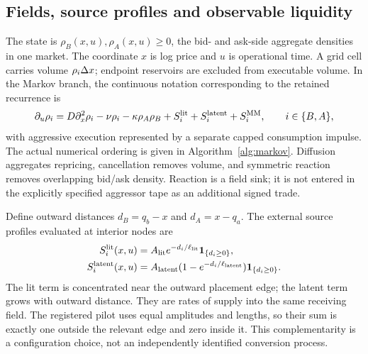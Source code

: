 \documentclass[11pt,a4paper]{article}
\begin{document}
\subsection{Fields, source profiles and observable liquidity}
The state is $\rho_B(x,u),\rho_A(x,u)\geq0$, the bid- and ask-side aggregate densities in one market. The coordinate $x$ is log price and $u$ is operational time. A grid cell carries volume $\rho_i\Delta x$; endpoint reservoirs are excluded from executable volume. In the Markov branch, the continuous notation corresponding to the retained recurrence is
\begin{equation}\label{eq:fields}
\partial_u\rho_i=D\partial_x^2\rho_i-\nu\rho_i-\kappa\rho_A\rho_B
+S_i^{\rm lit}+S_i^{\rm latent}+S_i^{\rm MM},\qquad i\in\{B,A\},
\end{equation}
with aggressive execution represented by a separate capped consumption impulse. The actual numerical ordering is given in Algorithm~\ref{alg:markov}. Diffusion aggregates repricing, cancellation removes volume, and symmetric reaction removes overlapping bid/ask density. Reaction is a field sink; it is not entered in the explicitly specified aggressor tape as an additional signed trade.

Define outward distances $d_B=q_b-x$ and $d_A=x-q_a$. The external source profiles evaluated at interior nodes are
\begin{equation}\label{eq:sources}
\begin{aligned}
S_i^{\rm lit}(x,u)&=A_{\rm lit}e^{-d_i/\ell_{\rm lit}}\mathbf1_{\{d_i\geq0\}},\\
S_i^{\rm latent}(x,u)&=A_{\rm latent}(1-e^{-d_i/\ell_{\rm latent}})\mathbf1_{\{d_i\geq0\}}.
\end{aligned}
\end{equation}
The lit term is concentrated near the outward placement edge; the latent term grows with outward distance. They are rates of supply into the same receiving field. The registered pilot uses equal amplitudes and lengths, so their sum is exactly one outside the relevant edge and zero inside it. This complementarity is a configuration choice, not an independently identified conversion process.
\end{document}
